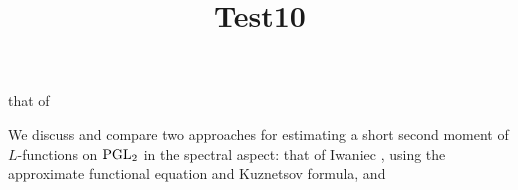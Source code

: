\documentclass[reqno]{amsart} 
\title{Test10}
\numberwithin{equation}{section}
\numberwithin{theorem}{section}
\begin{document}
\maketitle
\tableofcontents


that of \cite[\S5.1.4]{michel-2009}

We discuss and compare two approaches for estimating a short second moment of $L$-functions on $\operatorname{PGL}_2$ in the spectral aspect: that of Iwaniec \cite{Iwaniec1992}, using the approximate functional equation and Kuznetsov formula, and




{} 
\end{document}
